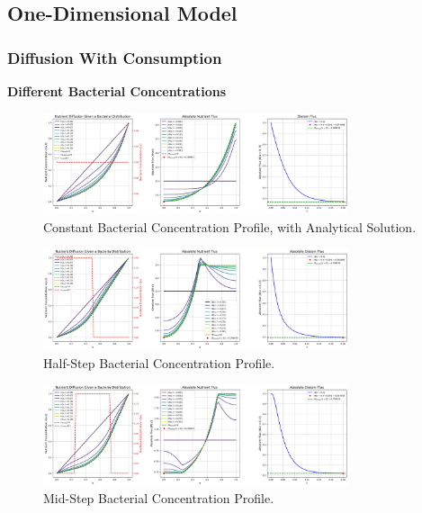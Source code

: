 \subsection{One-Dimensional Model}

\subsubsection{Diffusion With Consumption}

\textbf{Different Bacterial Concentrations}

\begin{figure}[H]
    \centering
    \includegraphics[width=0.8\textwidth]{Figures/c_const(x)_Analyt.png}
    \caption{Constant Bacterial Concentration Profile, with Analytical Solution.}
    \label{fig:c_const}
\end{figure}

\begin{figure}[H]
    \centering
    \includegraphics[width=0.8\textwidth]{Figures/c_halfstep(x).png}
    \caption{Half-Step Bacterial Concentration Profile.}
    \label{fig:c_halfstep}
\end{figure}

\begin{figure}[H]
    \centering
    \includegraphics[width=0.8\textwidth]{Figures/c_midstep(x).png}
    \caption{Mid-Step Bacterial Concentration Profile.}
    \label{fig:c_midstep}
\end{figure}

